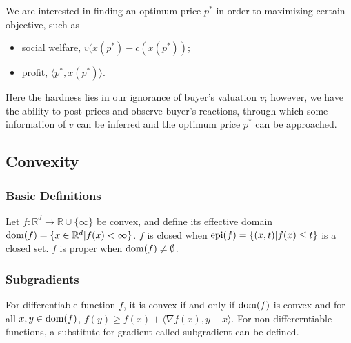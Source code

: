\documentclass{article}
\def\epi{\textup{epi}}
\def\dom{\textup{dom}}
\begin{document}
We are interested in finding an optimum price $p^*$ in order to maximizing certain objective, such as
\begin{itemize}
    \item social welfare, $v(x(p^*)-c(x(p^*))$;
    \item profit, $\langle p^*,x(p^*)\rangle$.
\end{itemize}
Here the hardness lies in our ignorance of buyer's valuation $v$; however, we have the ability to post prices and observe buyer's reactions, through which some information of $v$ can be inferred and the optimum price $p^*$ can be approached.

\subsection{Convexity}
\subsubsection{Basic Definitions}
Let $f:\mathbb{R}^d\to \mathbb{R}\cup\{\infty\}$ be convex, and define its effective domain $\dom(f)=\{x\in \mathbb{R}^d|f(x)<\infty\}$. $f$ is closed when $\epi(f)=\{(x,t)|f(x)\le t\}$ is a closed set. $f$ is proper when $\dom(f)\ne\emptyset$.

\subsubsection{Subgradients}
For differentiable function $f$, it is convex if and only if $\dom(f)$ is convex and for all $x,y\in\dom(f)$, $f(y)\ge f(x)+\langle\nabla f(x),y-x\rangle$. For non-differerntiable functions, a substitute for gradient called subgradient can be defined.
\end{document}
